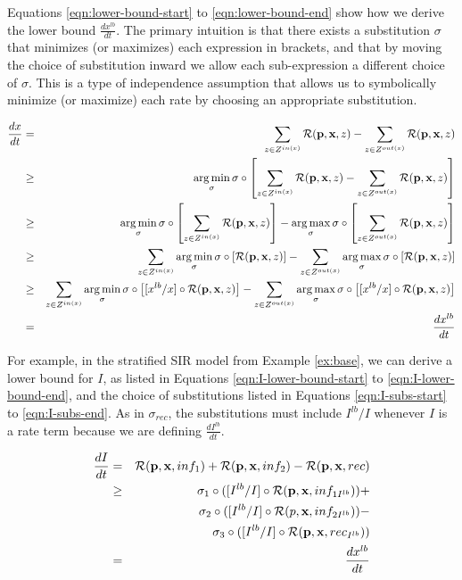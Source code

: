 Equations \ref{eqn:lower-bound-start} to \ref{eqn:lower-bound-end} show how we derive the lower bound $\frac{dx^{lb}}{dt}$.  The primary intuition is that there exists a substitution ${\sigma}$ that minimizes (or maximizes) each expression in brackets, and that by moving the choice of substitution inward we allow each sub-expression a different choice of $\sigma$.  This is a type of independence assumption that allows us to symbolically minimize (or maximize) each rate by choosing an appropriate substitution.

\begin{eqnarray}\label{eqn:lower-bound-start}
    \frac{dx}{dt} &=&\sum_{z \in Z^{in(x)}} {\cal R}({\bf p}, {\bf x}, z) - \sum_{z \in Z^{out(x)} } {\cal R}({\bf p}, {\bf x}, z)\\
    &\geq& \operatorname*{arg\,min}_{{ \sigma}}  \sigma\circ\left[\sum_{z \in Z^{in(x)}} {\cal R}({\bf p}, {\bf x}, z) - \sum_{z \in Z^{out(x)} } {\cal R}({\bf p}, {\bf x}, z)\right]\\
    &\geq& \operatorname*{arg\,min}_{{\sigma}} \sigma\circ\left[\sum_{z \in Z^{in(x)}} {\cal R}({\bf p}, {\bf x}, z)\right] - \operatorname*{arg\,max}_{{\sigma}}\sigma\circ \left[\sum_{z \in Z^{out(x)} } {\cal R}({\bf p}, {\bf x}, z)\right]\\
    &\geq& \sum_{z \in Z^{in(x)}} \operatorname*{arg\,min}_{{\sigma}}\sigma\circ \left[{\cal R}({\bf p}, {\bf x}, z) \right] - \sum_{z \in Z^{out(x)} } \operatorname*{arg\,max}_{{\sigma}}\sigma\circ\left[{\cal R}({\bf p}, {\bf x}, z)\right]\\
    &\geq& \sum_{z \in Z^{in(x)}} \operatorname*{arg\,min}_{{\sigma}} \sigma\circ \left[[x^{lb}/x]\circ{\cal R}({\bf p}, {\bf x}, z) \right] - \sum_{z \in Z^{out(x)} } \operatorname*{arg\,max}_{{\sigma}}\sigma\circ\left[[x^{lb}/x]\circ {\cal R}({\bf p}, {\bf x}, z)\right]\\
    &=& \frac{dx^{lb}}{dt}\label{eqn:lower-bound-end}
\end{eqnarray}



For example, in the stratified SIR model from Example \ref{ex:base}, we can derive a lower bound for $I$, as listed in Equations \ref{eqn:I-lower-bound-start} to \ref{eqn:I-lower-bound-end}, and the choice of substitutions listed in Equations \ref{eqn:I-subs-start} to \ref{eqn:I-subs-end}.  As in $\sigma_{rec}$, the substitutions must include $I^{lb}/I$ whenever $I$ is a rate term because we are defining $\frac{dI^{lb}}{dt}$.  


\begin{eqnarray}\label{eqn:I-lower-bound-start}
    \frac{dI}{dt} &=& {\cal R}({\bf p}, {\bf x}, inf_1) + {\cal R}({\bf p}, {\bf x}, inf_2) -  {\cal R}({\bf p}, {\bf x}, rec)\\
    &\geq& \sigma_1 \circ ([I^{lb}/I] \circ {\cal R}({\bf p}, {\bf x}, inf_{1 I^{lb}})) + \\
    && \sigma_2 \circ ([I^{lb}/I] \circ {\cal R}({ p}, {\bf x}, inf_{2 I^{lb}})) -  \\
    && \sigma_3 \circ ([I^{lb}/I] \circ {\cal R}({\bf p}, {\bf x}, rec_{I^{lb}}))\\
    &=& \frac{dx^{lb}}{dt}\label{eqn:I-lower-bound-end}
\end{eqnarray}

